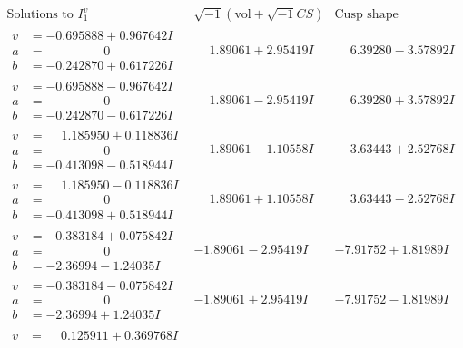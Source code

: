 \documentclass[1p]{elsarticle_modified}
\theoremstyle{definition}
\newcommand{\I}{\sqrt{-1}}
\begin{document}
$$\begin{array}{c|c|c}  
\text{Solutions to }I^v_{1}& \I (\text{vol} + \sqrt{-1}CS) & \text{Cusp shape}\\
 \hline 
\begin{aligned}
v &= -0.695888 + 0.967642 I \\
a &= \phantom{-0.000000 } 0 \\
b &= -0.242870 + 0.617226 I\end{aligned}
 & \phantom{-}1.89061 + 2.95419 I & \phantom{-}6.39280 - 3.57892 I \\ \hline\begin{aligned}
v &= -0.695888 - 0.967642 I \\
a &= \phantom{-0.000000 } 0 \\
b &= -0.242870 - 0.617226 I\end{aligned}
 & \phantom{-}1.89061 - 2.95419 I & \phantom{-}6.39280 + 3.57892 I \\ \hline\begin{aligned}
v &= \phantom{-}1.185950 + 0.118836 I \\
a &= \phantom{-0.000000 } 0 \\
b &= -0.413098 - 0.518944 I\end{aligned}
 & \phantom{-}1.89061 - 1.10558 I & \phantom{-}3.63443 + 2.52768 I \\ \hline\begin{aligned}
v &= \phantom{-}1.185950 - 0.118836 I \\
a &= \phantom{-0.000000 } 0 \\
b &= -0.413098 + 0.518944 I\end{aligned}
 & \phantom{-}1.89061 + 1.10558 I & \phantom{-}3.63443 - 2.52768 I \\ \hline\begin{aligned}
v &= -0.383184 + 0.075842 I \\
a &= \phantom{-0.000000 } 0 \\
b &= -2.36994 - 1.24035 I\end{aligned}
 & -1.89061 - 2.95419 I & -7.91752 + 1.81989 I \\ \hline\begin{aligned}
v &= -0.383184 - 0.075842 I \\
a &= \phantom{-0.000000 } 0 \\
b &= -2.36994 + 1.24035 I\end{aligned}
 & -1.89061 + 2.95419 I & -7.91752 - 1.81989 I \\ \hline\begin{aligned}
v &= \phantom{-}0.125911 + 0.369768 I \\

\end{aligned}
\end{array}$$
\end{document}
